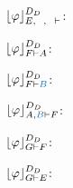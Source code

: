 \documentclass{llncs}
\begin{document}
\begin{example}
\begin{multicols}{3}
{$\projectionDDefinitional{\varphi}{E, \hD{A}, \hC{B} \seq }$:
\begin{small}
\begin{prooftree}
 
		 
		 
	 
\end{prooftree}
\end{small}
}
\end{multicols}




\begin{multicols}{3}{
$\projectionDDefinitional{\varphi}{F \seq \hA{A}}$:
\begin{prooftree}
 
 
 
\end{prooftree}

$\projectionDDefinitional{\varphi}{F \seq \hB{B}}$:
\begin{prooftree}
 
 
 
\end{prooftree}

$\projectionDDefinitional{\varphi}{\hA{A}, \hB{B} \seq F}$:
\begin{prooftree}
		 
	 
\end{prooftree}
}
\end{multicols}





\begin{multicols}{3}{
$\projectionDDefinitional{\varphi}{G \seq F}$:
\begin{prooftree}
 
 
 
\end{prooftree}

$\projectionDDefinitional{\varphi}{G \seq E}$:
\begin{prooftree}
 
 
 
\end{prooftree}

}
\end{multicols}
\end{example}
\end{document}
